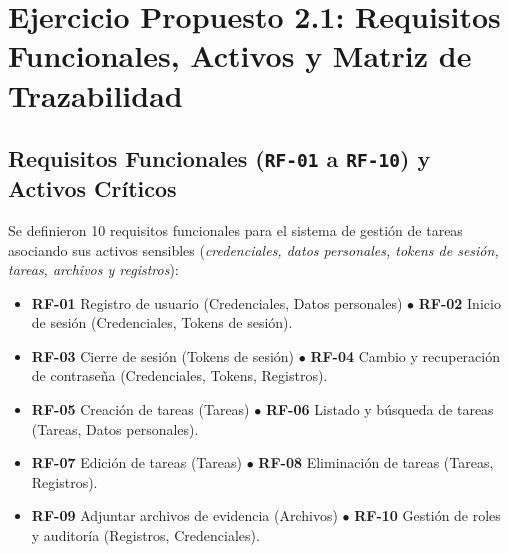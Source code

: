 \documentclass[12pt,a4paper]{article}
\begin{document}
\section{Ejercicio Propuesto 2.1: Requisitos Funcionales, Activos y Matriz de Trazabilidad}

\subsection{Requisitos Funcionales (\texttt{RF-01} a \texttt{RF-10}) y Activos Críticos}
Se definieron 10 requisitos funcionales para el sistema de gestión de tareas asociando sus activos sensibles (\textit{credenciales, datos personales, tokens de sesión, tareas, archivos y registros}):
\begin{itemize}
    \item \textbf{RF-01} Registro de usuario (Credenciales, Datos personales) $\bullet$ \textbf{RF-02} Inicio de sesión (Credenciales, Tokens de sesión).
    \item \textbf{RF-03} Cierre de sesión (Tokens de sesión) $\bullet$ \textbf{RF-04} Cambio y recuperación de contraseña (Credenciales, Tokens, Registros).
    \item \textbf{RF-05} Creación de tareas (Tareas) $\bullet$ \textbf{RF-06} Listado y búsqueda de tareas (Tareas, Datos personales).
    \item \textbf{RF-07} Edición de tareas (Tareas) $\bullet$ \textbf{RF-08} Eliminación de tareas (Tareas, Registros).
    \item \textbf{RF-09} Adjuntar archivos de evidencia (Archivos) $\bullet$ \textbf{RF-10} Gestión de roles y auditoría (Registros, Credenciales).
\end{itemize}
\end{document}
